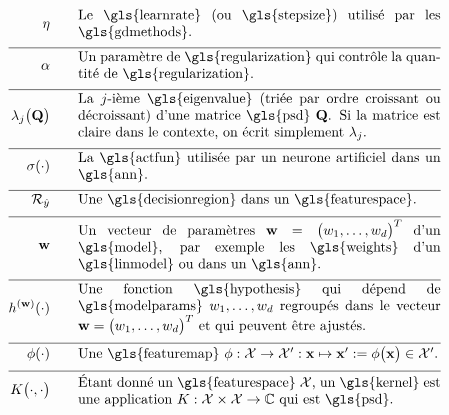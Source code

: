 \begin{align}
	\lrate  \quad\quad & \parbox{.75\textwidth}{Le \gls{learnrate} (ou \gls{stepsize}) utilisé par les \gls{gdmethods}.}  \nonumber \\[2mm] \hline \nonumber\\[-5mm]
	\regparam \quad\quad &\parbox{.75\textwidth}{Un paramètre de \gls{regularization} qui contrôle la quantité de \gls{regularization}.} \nonumber \\[2mm] \hline \nonumber\\[-5mm]
	\eigval{\featureidx}\big( \mathbf{Q} \big) \quad\quad &\parbox{.75\textwidth}{La $\featureidx$-ième \gls{eigenvalue} (triée par ordre croissant ou décroissant) d’une matrice \gls{psd} $\mathbf{Q}$. Si la matrice est claire dans le contexte, on écrit simplement $\eigval{\featureidx}$.} \nonumber \\[2mm] \hline \nonumber\\[-5mm]
	\actfun(\cdot) \quad\quad &\parbox{.75\textwidth}{La \gls{actfun} utilisée par un neurone artificiel dans un \gls{ann}.} \nonumber \\[2mm] \hline \nonumber\\[-5mm]
	\decreg{\hat{\truelabel}} \quad\quad &\parbox{.75\textwidth}{Une \gls{decisionregion} dans un \gls{featurespace}.} \nonumber \\[2mm] \hline \nonumber\\[-5mm]  
	\weights  \quad\quad & \parbox{.75\textwidth}{Un vecteur de paramètres $\weights = \big(\weight_{1},\ldots,\weight_{\featuredim}\big)^{T}$ d’un \gls{model}, par exemple les \gls{weights} d’un \gls{linmodel} ou dans un \gls{ann}.} \nonumber \\[2mm] \hline \nonumber\\[-5mm]
	\hypothesis^{(\weights)}(\cdot)  \quad\quad &\parbox{.75\textwidth}{Une fonction \gls{hypothesis} qui dépend de \gls{modelparams} $\weight_{1},\ldots,\weight_{\featuredim}$ regroupés dans le vecteur $\weights=\big(\weight_{1},\ldots,\weight_{\featuredim} \big)^{T}$ et qui peuvent être ajustés.} \nonumber \\[2mm] \hline \nonumber\\[-5mm]
	\featuremap(\cdot)  \quad\quad & \parbox{.75\textwidth}{Une \gls{featuremap} $\featuremap: \featurespace \rightarrow \featurespace' : \featurevec \mapsto \featurevec' \defeq \featuremap\big( \featurevec \big) \in \featurespace'$.} \nonumber \\[2mm] \hline \nonumber\\[-5mm]
	\kernelmap{\cdot}{\cdot} \quad\quad & \parbox{.75\textwidth}{Étant donné un \gls{featurespace} $\featurespace$, un \gls{kernel} est une application $\kernel: \featurespace \times \featurespace \rightarrow \mathbb{C}$ qui est \gls{psd}.} \nonumber                                                                                                                                               
\end{align}
            






